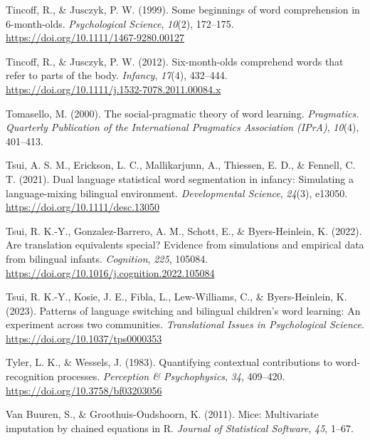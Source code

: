 \documentclass[
  12pt,
  b5paperpaper,
  twoside]{scrreprt}
\newlength{\cslhangindent}
\newlength{\cslentryspacingunit} %
\newenvironment{CSLReferences}[2] %
 {%
  \setlength{\parindent}{0pt}
  \ifodd #1
  \let\oldpar\par
  \def\par{\hangindent=\cslhangindent\oldpar}
  \fi
  \setlength{\parskip}{#2\cslentryspacingunit}
 }%
 {}
\begin{document}
\begin{CSLReferences}{1}{0}
\leavevmode{}%
Tincoff, R., \& Jusczyk, P. W. (1999). Some beginnings of word
comprehension in 6-month-olds. \emph{Psychological Science},
\emph{10}(2), 172--175. \url{https://doi.org/10.1111/1467-9280.00127}

\leavevmode{}%
Tincoff, R., \& Jusczyk, P. W. (2012). Six-month-olds comprehend words
that refer to parts of the body. \emph{Infancy}, \emph{17}(4), 432--444.
\url{https://doi.org/10.1111/j.1532-7078.2011.00084.x}

\leavevmode{}%
Tomasello, M. (2000). The social-pragmatic theory of word learning.
\emph{Pragmatics. Quarterly Publication of the International Pragmatics
Association (IPrA)}, \emph{10}(4), 401--413.

\leavevmode{}%
Tsui, A. S. M., Erickson, L. C., Mallikarjunn, A., Thiessen, E. D., \&
Fennell, C. T. (2021). Dual language statistical word segmentation in
infancy: Simulating a language-mixing bilingual environment.
\emph{Developmental Science}, \emph{24}(3), e13050.
\url{https://doi.org/10.1111/desc.13050}

\leavevmode{}%
Tsui, R. K.-Y., Gonzalez-Barrero, A. M., Schott, E., \& Byers-Heinlein,
K. (2022). Are translation equivalents special? {Evidence} from
simulations and empirical data from bilingual infants. \emph{Cognition},
\emph{225}, 105084.
\url{https://doi.org/10.1016/j.cognition.2022.105084}

\leavevmode{}%
Tsui, R. K.-Y., Kosie, J. E., Fibla, L., Lew-Williams, C., \&
Byers-Heinlein, K. (2023). Patterns of language switching and bilingual
children's word learning: An experiment across two communities.
\emph{Translational Issues in Psychological Science}.
\url{https://doi.org/10.1037/tps0000353}

\leavevmode{}%
Tyler, L. K., \& Wessels, J. (1983). Quantifying contextual
contributions to word-recognition processes. \emph{Perception \&
Psychophysics}, \emph{34}, 409--420.
\url{https://doi.org/10.3758/bf03203056}

\leavevmode{}%
Van Buuren, S., \& Groothuis-Oudshoorn, K. (2011). Mice: Multivariate
imputation by chained equations in {R}. \emph{Journal of Statistical
Software}, \emph{45}, 1--67.


\end{CSLReferences}
\end{document}

